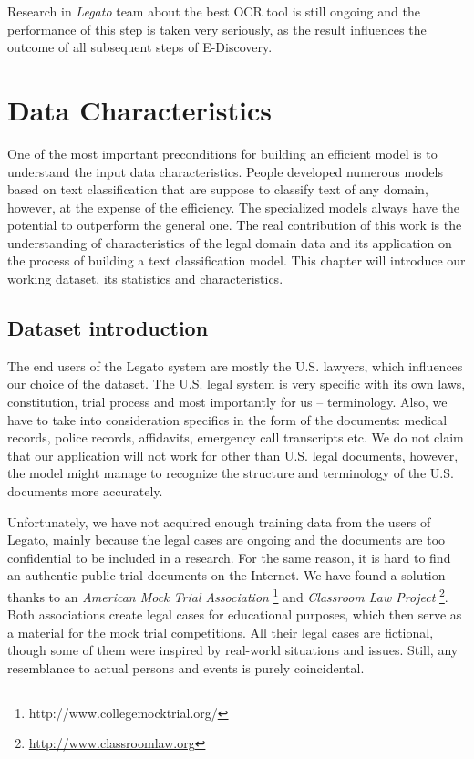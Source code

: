\documentclass[
  digital, %
  table,   %
  lof,     %
  lot,     %
]{fithesis3}
\begin{document}
Research in \textit{Legato} team about the best OCR tool is still ongoing and the performance of this step is taken very seriously, as the result influences the outcome of all subsequent steps of E-Discovery.



\chapter{Data Characteristics}
\label{chp:data_characteristics}
One of the most important preconditions for building an efficient model is to understand the input data characteristics.
People developed numerous models based on text classification that are suppose to classify text of any domain, however, at the expense of the efficiency.
The specialized models always have the potential to outperform the general one.
The real contribution of this work is the understanding of characteristics of the legal domain data and its application on the process of building a text classification model.
This chapter will introduce our working dataset, its statistics and characteristics.

\section{Dataset introduction}
The end users of the Legato system are mostly the U.S. lawyers, which influences our choice of the dataset.
The U.S. legal system is very specific with its own laws, constitution, trial process and most importantly for us -- terminology.
Also, we have to take into consideration specifics in the form of the documents: medical records, police records, affidavits, emergency call transcripts etc.
We do not claim that our application will not work for other than U.S. legal documents, however, the model might manage to recognize the structure and terminology of the U.S. documents more accurately.

Unfortunately, we have not acquired enough training data from the users of Legato, mainly because the legal cases are ongoing and the documents are too confidential to be included in a research.
For the same reason, it is hard to find an authentic public trial documents on the Internet.
We have found a solution thanks to an \textit{American Mock Trial Association} \footnote{http://www.collegemocktrial.org/} and \textit{Classroom Law Project} \footnote{\url{http://www.classroomlaw.org}}.
Both associations create legal cases for educational purposes, which then serve as a material for the mock trial competitions.
All their legal cases are fictional, though some of them were inspired by real-world situations and issues.
Still, any resemblance to actual persons and events is purely coincidental.
\end{document}
